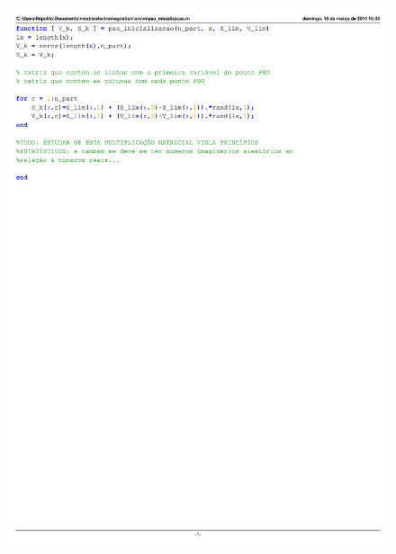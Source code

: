 \documentclass{IEEEtran}
\begin{document}
\begin{figure}
	\centering
	\includegraphics{pso_inicializacao.pdf}
	\label{pso_inicializacao}
\end{figure}
\end{document}
